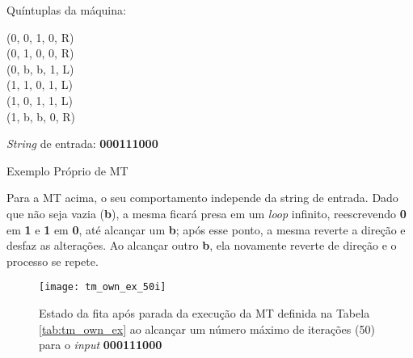 \begin{table}[H]
    \begin{minipage}{0.6\linewidth}

        \begin{minipage}{0.55\linewidth}
            Quíntuplas da máquina:
        \end{minipage}%
        \begin{minipage}{0.45\linewidth}
            \begin{flushleft}
                \ttfamily
                (0, 0, 1, 0, R) \\
                (0, 1, 0, 0, R) \\
                (0, b, b, 1, L) \\
                (1, 1, 0, 1, L) \\
                (1, 0, 1, 1, L) \\
                (1, b, b, 0, R)
            \end{flushleft}
        \end{minipage}

    \end{minipage}%
    \begin{minipage}{0.4\linewidth}

        \textit{String} de entrada: \textbf{000111000}

    \end{minipage}

    \caption{Exemplo Próprio de MT}
    \label{tab:tm_own_ex}
\end{table}

Para a MT acima, o seu comportamento independe da string de entrada. Dado que
não seja vazia (\textbf{b}), a mesma ficará presa em um \textit{loop} infinito,
reescrevendo \textbf{0} em \textbf{1} e \textbf{1} em \textbf{0}, até alcançar
um \textbf{b}; após esse ponto, a mesma reverte a direção e desfaz as
alterações. Ao alcançar outro \textbf{b}, ela novamente reverte de direção e
o processo se repete.

\begin{figure}[H]
    \centering
    \texttt{[image: tm\_own\_ex\_50i]}
    \caption{
        Estado da fita após parada da execução da MT definida na
        Tabela \ref{tab:tm_own_ex} ao alcançar um número máximo de iterações
        (50) para o \textit{input} \textbf{000111000}
    }
    \label{fig:tm_own_ex_50i}
\end{figure}